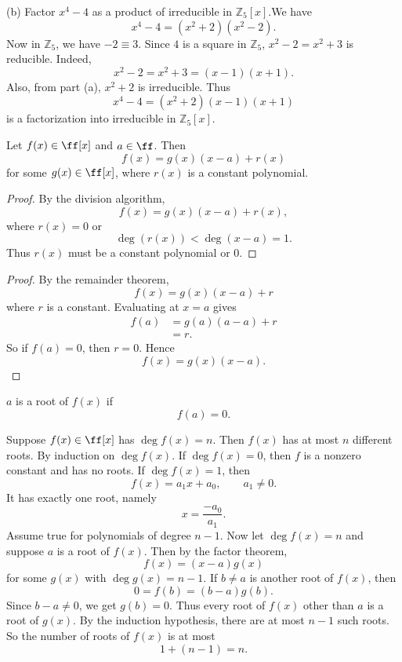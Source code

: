 (b) Factor $x^4-4$ as a product of irreducible in $\mathbb{Z}_5[x]$.We have
\[
    x^4-4=(x^2+2)(x^2-2).
\]
Now in $\mathbb{Z}_5$, we have $-2\equiv 3$.
Since $4$ is a square in $\mathbb{Z}_5$, $x^2-2=x^2+3$ is reducible.
Indeed,
\[
    x^2-2=x^2+3=(x-1)(x+1).
\]
Also, from part (a), $x^2+2$ is irreducible.
Thus
\[
    x^4-4=(x^2+2)(x-1)(x+1)
\]
is a factorization into irreducible in $\mathbb{Z}_5[x]$.

\begin{theorem*}{
    Let $f(x)\in\ff[x]$ and $a\in\ff$.
    Then
    \[
        f(x)=g(x)(x-a)+r(x)
    \]
    for some $g(x)\in\ff[x]$, where $r(x)$ is a constant polynomial.
}
\end{theorem*}

\begin{proof}
    By the division algorithm,
    \[
        f(x)=g(x)(x-a)+r(x),
    \]
    where $r(x)=0$ or
    \[
        \deg(r(x))<\deg(x-a)=1.
    \]
    Thus $r(x)$ must be a constant polynomial or $0$.
\end{proof}

\begin{proof}
    By the remainder theorem,
    \[
        f(x)=g(x)(x-a)+r
    \]
    where $r$ is a constant.
    Evaluating at $x=a$ gives
    \begin{align*}
        f(a) &= g(a)(a-a)+r\\
        &= r.
    \end{align*}
    So if $f(a)=0$, then $r=0$.
    Hence
    \[
        f(x)=g(x)(x-a).
    \]
\end{proof}

\begin{definition}[Roots]
    $a$ is a root of $f(x)$ if
    \[
        f(a)=0.
    \]
\end{definition}

\begin{corollary}{
    Suppose $f(x)\in\ff[x]$ has $\deg f(x)=n$.
    Then $f(x)$ has at most $n$ different roots.
}
    By induction on $\deg f(x)$.
    If $\deg f(x)=0$, then $f$ is a nonzero constant and has no roots.
    If $\deg f(x)=1$, then
    \[
        f(x)=a_{1}x+a_0,
        \qquad a_1\neq 0.
    \]
    It has exactly one root, namely
    \[
        x=\frac{-a_0}{a_1}.
    \]
    Assume true for polynomials of degree $n-1$.
    Now let $\deg f(x)=n$ and suppose $a$ is a root of $f(x)$.
    Then by the factor theorem,
    \[
        f(x)=(x-a)g(x)
    \]
    for some $g(x)$ with $\deg g(x)=n-1$.
    If $b\neq a$ is another root of $f(x)$, then
    \[
        0=f(b)=(b-a)g(b).
    \]
    Since $b-a\neq 0$, we get $g(b)=0$.
    Thus every root of $f(x)$ other than $a$ is a root of $g(x)$.
    By the induction hypothesis, there are at most $n-1$ such roots.
    So the number of roots of $f(x)$ is at most
    \[
        1+(n-1)=n.
    \]
\end{corollary}

